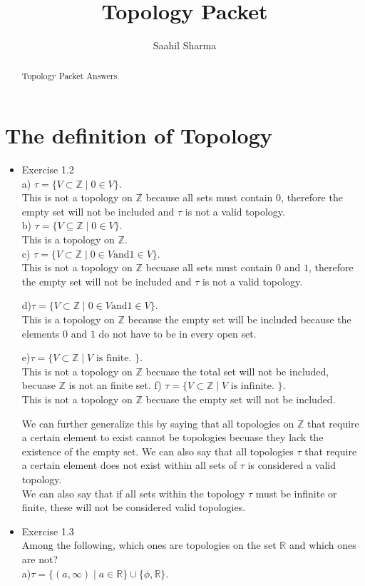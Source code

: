 \documentclass{article}
\author{Saahil Sharma}
\title{Topology Packet}
\begin{document}
\begin{abstract}
        Topology Packet Answers. 
\end{abstract}
\section{The definition of Topology}
\begin{itemize}
\item Exercise 1.2 \\
         a) $\tau = \{V \subset \mathbb{Z} \mid 0 \in V \}.$ \\ 
            This is not a topology on $\mathbb{Z}$ because all sets must contain $0$, therefore the empty set will not be included and $\tau$ is not a valid topology. 
       \\  b) $\tau = \{V \subseteq \mathbb{Z} \mid 0 \in V \}.$ \\
            This is a topology on $\mathbb{Z}$.   
       \\   c) $\tau = \{ V \subset \mathbb{Z} \mid 0 \in V \text{and} 1 \in V \}$. \\ 
            This is not a topology on $\mathbb{Z}$ becuase all sets must contain $0$ and $1$, therefore the empty set will not             be included and $\tau$ is not a valid topology. 


        d)$\tau = \{ V \subset \mathbb{Z} \mid 0 \in V \text{and} 1 \in V \}$.  \\ 
           This is  a topology on $\mathbb{Z}$ because the empty set will be included because  the elements $0$ and $1$ do not have to be in every open set.              

        e)$\tau = \{ V \subset \mathbb{Z} \mid V \text{ is finite. } \}$.  \\ 
          This is not a topology on $\mathbb{Z}$ becuase the total set will not be included, becuase $\mathbb{Z}$ is not an finite set.  
        f) $\tau = \{ V \subset \mathbb{Z} \mid V \text{ is infinite. } \}$. \\   
          This is not a topology on $\mathbb{Z}$ becuase the empty set will not be included.


        We can further generalize this by saying that all topologies on $\mathbb{Z}$ that require a certain element to exist cannot be topologies becuase they lack the existence of the empty set. 
        We can also say that all topologies $\tau$ that require a certain element does not exist within all sets of $\tau$ is considered a valid topology. 
       \\ 
        We can also say that if all sets within the topology $\tau$ must be infinite or finite, these will not be considered valid topologies.         
\\
\item Exercise 1.3 
 \\       Among the following, which ones are topologies on the set $\mathbb{R}$ and which ones are not? \\
        a)$\tau = \{(a, \infty) \mid a \in \mathbb{R}\} \cup \{\phi, \mathbb{R}\}$. \\
        

\end{itemize}
\end{document}
